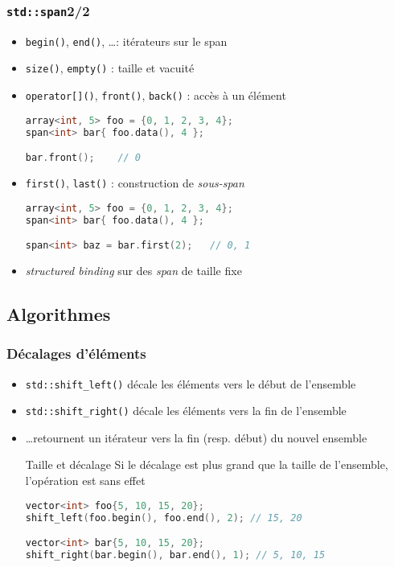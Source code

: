 \documentclass[C++.tex]{subfiles}
\begin{document}
\begin{frame}[fragile]
	\frametitle{\lstinline|std::span|\titlehfill{}2/2}
	\begin{itemize}
		\item \lstinline|begin()|, \lstinline|end()|, \ldots : itérateurs sur le span
		\item \lstinline|size()|, \lstinline|empty()| : taille et vacuité
		\item \lstinline|operator[]()|, \lstinline|front()|, \lstinline|back()| : accès à un élément

		\begin{lstlisting}[language=C++]
array<int, 5> foo = {0, 1, 2, 3, 4};
span<int> bar{ foo.data(), 4 };

bar.front();    // 0\end{lstlisting}

		\item \lstinline|first()|, \lstinline|last()| : construction de \textit{sous-span}

		\begin{lstlisting}[language=C++]
array<int, 5> foo = {0, 1, 2, 3, 4};
span<int> bar{ foo.data(), 4 };

span<int> baz = bar.first(2);   // 0, 1\end{lstlisting}

		\item \textit{structured binding} sur des \textit{span} de taille fixe
	\end{itemize}
\end{frame}

\subsection*{Algorithmes}
\begin{frame}[fragile]
	\frametitle{Décalages d'éléments}
	\begin{itemize}
		\item \lstinline|std::shift_left()| décale les éléments vers le début de l'ensemble
		\item \lstinline|std::shift_right()| décale les éléments vers la fin de l'ensemble
		\item \ldots retournent un itérateur vers la fin (resp. début) du nouvel ensemble

		\begin{block}{Taille et décalage}
			Si le décalage est plus grand que la taille de l'ensemble, l'opération est sans effet
		\end{block}

		\begin{lstlisting}[language=C++]
vector<int> foo{5, 10, 15, 20};
shift_left(foo.begin(), foo.end(), 2); // 15, 20

vector<int> bar{5, 10, 15, 20};
shift_right(bar.begin(), bar.end(), 1); // 5, 10, 15\end{lstlisting}
	\end{itemize}
\end{frame}
\end{document}
